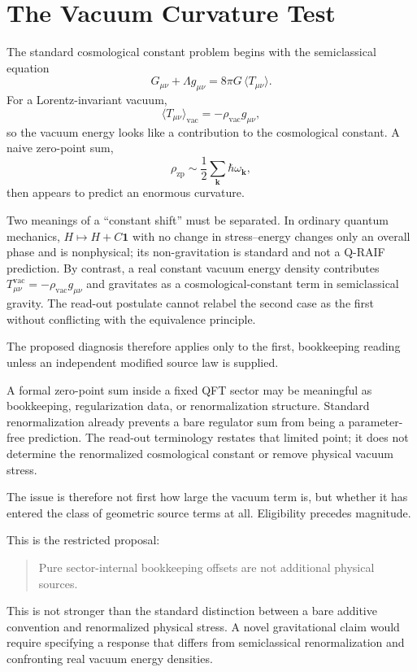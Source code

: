 \documentclass[12pt,a4paper]{article}
\theoremstyle{definition}
\theoremstyle{remark}
\begin{document}
\section{The Vacuum Curvature Test}
\label{sec:vacuum-test}

The standard cosmological constant problem begins with the semiclassical equation
\[
G_{\mu\nu}+\Lambda g_{\mu\nu}=8\pi G\,\langle T_{\mu\nu}\rangle .
\]
For a Lorentz-invariant vacuum,
\[
\langle T_{\mu\nu}\rangle_{\mathrm{vac}}=-\rho_{\mathrm{vac}}g_{\mu\nu},
\]
so the vacuum energy looks like a contribution to the cosmological constant. A naive zero-point sum,
\[
\rho_{\mathrm{zp}}\sim \frac{1}{2}\sum_{\mathbf{k}}\hbar\omega_{\mathbf{k}},
\]
then appears to predict an enormous curvature.

Two meanings of a ``constant shift'' must be separated.  In ordinary quantum mechanics, $H\mapsto H+C\mathbf1$ with no change in stress--energy changes only an overall phase and is nonphysical; its non-gravitation is standard and not a Q-RAIF prediction.  By contrast, a real constant vacuum energy density contributes $T_{\mu\nu}^{\mathrm{vac}}=-\rho_{\mathrm{vac}}g_{\mu\nu}$ and gravitates as a cosmological-constant term in semiclassical gravity.  The read-out postulate cannot relabel the second case as the first without conflicting with the equivalence principle.

The proposed diagnosis therefore applies only to the first, bookkeeping reading unless an independent modified source law is supplied.

A formal zero-point sum inside a fixed QFT sector may be meaningful as bookkeeping, regularization data, or renormalization structure.  Standard renormalization already prevents a bare regulator sum from being a parameter-free prediction.  The read-out terminology restates that limited point; it does not determine the renormalized cosmological constant or remove physical vacuum stress.

The issue is therefore not first how large the vacuum term is, but whether it has entered the class of geometric source terms at all. Eligibility precedes magnitude.

This is the restricted proposal:

\begin{quote}
Pure sector-internal bookkeeping offsets are not additional physical sources.
\end{quote}

This is not stronger than the standard distinction between a bare additive convention and renormalized physical stress.  A novel gravitational claim would require specifying a response that differs from semiclassical renormalization and confronting real vacuum energy densities.
\end{document}
